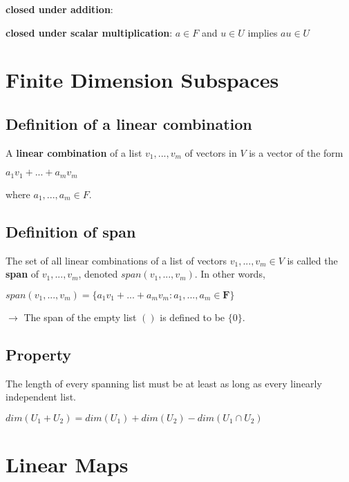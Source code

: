 \documentclass{article}
\begin{document}
    \textbf{closed under addition}: \hspace{70pt}{$u,w \in U$ implies $u+w \in U$}

    \textbf{closed under scalar multiplication}: \hspace{10pt}$a \in F$ and $u \in U$ implies $au \in U$


\section{Finite Dimension Subspaces}
\subsection{Definition of a linear combination}

A \textbf{linear combination} of a list $v_1,..., v_m$ of vectors in $V$ is a vector of the form
\vspace{4pt}

\centerline{$a_1 v_1+ ... + a_m v_m$}

\parindent=0pt where $a_1,...,a_m \in F$.

\subsection{Definition of span}
The set of all linear combinations of a list of vectors $v_1, ..., v_m \in V$ is called the \textbf{span} of $v_1,..., v_m$, denoted $span(v_1,..., v_m)$. In other words,

\centerline{$span(v_1,..., v_m) = \{a_1v_1+...+a_mv_m : a_1,...,a_m \in \mathbf{F} \}$}
\vspace{8pt}
$\rightarrow$ The span of the empty list $( )$ is defined to be $\{0\}$.

\subsection{Property}

    The length of every spanning list must be at least as long as every linearly independent list.
    \vspace{8pt}
    
    \centerline{$dim(U_1+U_2) = dim(U_1) + dim(U_2) - dim(U_1 \cap U_2)$}
    
    
\section{Linear Maps}
\end{document}
